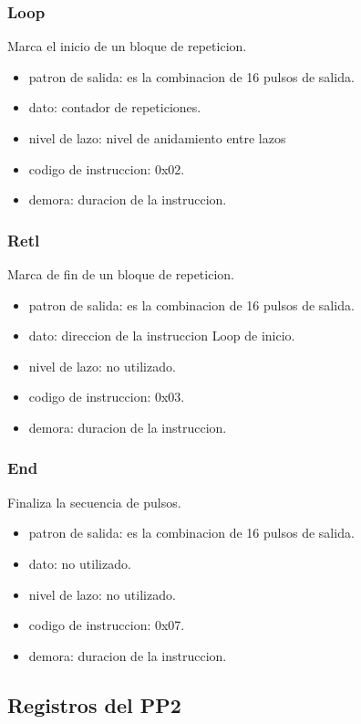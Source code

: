 \subsubsection{Loop}
Marca el inicio de un bloque de repeticion.
\begin{itemize}
    \item patron de salida: es la combinacion de 16 pulsos de salida.
    \item dato: contador de repeticiones.
    \item nivel de lazo: nivel de anidamiento entre lazos
    \item codigo de instruccion: 0x02.
    \item demora: duracion de la instruccion.
\end{itemize}

\subsubsection{Retl}
Marca de fin de un bloque de repeticion.
\begin{itemize}
    \item patron de salida: es la combinacion de 16 pulsos de salida.
    \item dato: direccion de la instruccion Loop de inicio.
    \item nivel de lazo: no utilizado.
    \item codigo de instruccion: 0x03.
    \item demora: duracion de la instruccion.
\end{itemize}

\subsubsection{End}
Finaliza la secuencia de pulsos.
\begin{itemize}
    \item patron de salida: es la combinacion de 16 pulsos de salida.
    \item dato: no utilizado.
    \item nivel de lazo: no utilizado.
    \item codigo de instruccion: 0x07.
    \item demora: duracion de la instruccion.
\end{itemize}

\subsection{Registros del PP2}

